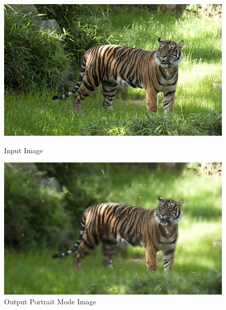 \documentclass[12pt]{article}
\begin{document}
\begin{figure}[!htb]
    \begin{minipage}{0.48\textwidth}
        \centering
        \includegraphics[width=0.9\linewidth]{tiger.jpg}
        \caption{Input Image}
    \end{minipage}\hfill
    \begin{minipage}{0.48\textwidth}
        \centering
        \includegraphics[width=0.9\linewidth]{tiger_portrait.jpg}
        \caption{Output Portrait Mode Image}
    \end{minipage}\hfill
\end{figure}
\end{document}

